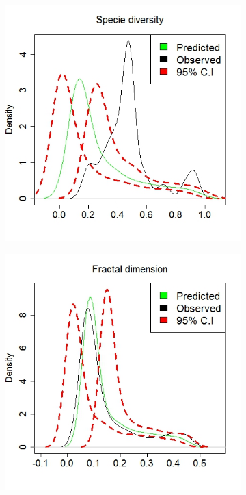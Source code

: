 \begin{figure}[!ht]
\begin{subfigure}[b]{.6\textwidth}
\includegraphics[width=1\textwidth]{p1a1/p1a1_1}
\end{subfigure}\hspace*{-.5em}
\centering
\begin{subfigure}[b]{.60\textwidth}
\includegraphics[width=1\textwidth]{p1a1/p1a1_3}

\end{subfigure}
\end{figure}

